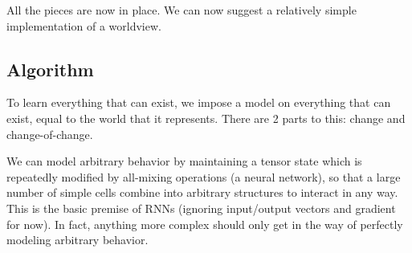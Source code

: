 \documentclass{article}
\begin{document}
All the pieces are now in place. We can now suggest a relatively simple implementation of a worldview.

\subsection{Algorithm\label{Algorithm}}

To learn everything that can exist, we impose a model on everything that can exist, equal to the world that it represents. There are 2 parts to this: change and change-of-change.

We can model arbitrary behavior by maintaining a tensor state which is repeatedly modified by all-mixing operations (a neural network), so that a large number of simple cells combine into arbitrary structures to interact in any way. This is the basic premise of RNNs (ignoring input/output vectors and gradient for now). In fact, anything more complex should only get in the way of perfectly modeling arbitrary behavior.
\end{document}
